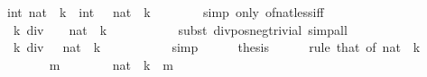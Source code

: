 \begin{isabellebody}
\ {\isacartoucheopen}int\ {\isacharparenleft}{\kern0pt}nat\ {\isacharparenleft}{\kern0pt}{\isacharminus}{\kern0pt}\ k{\isacharparenright}{\kern0pt}{\isacharparenright}{\kern0pt}\ {\isacharless}{\kern0pt}\ int\ {\isacharparenleft}{\kern0pt}{}\ {\isacharcircum}{\kern0pt}\ nat\ {\isacharparenleft}{\kern0pt}{\isacharminus}{\kern0pt}\ k{\isacharparenright}{\kern0pt}{\isacharparenright}{\kern0pt}{\isacartoucheclose}\isanewline
\ \ \ \ \ \ \isamarkupfalse%
\ {\isacharparenleft}{\kern0pt}simp\ only{\isacharcolon}{\kern0pt}\ of{\isacharunderscore}{\kern0pt}nat{\isacharunderscore}{\kern0pt}less{\isacharunderscore}{\kern0pt}iff{\isacharparenright}{\kern0pt}\isanewline
\ \ \ \ \isamarkupfalse%
\ \isamarkupfalse%
\ {\isacartoucheopen}{\isacharminus}{\kern0pt}\ k\ div\ {\isacharminus}{\kern0pt}\ {\isacharparenleft}{\kern0pt}{}\ {\isacharcircum}{\kern0pt}\ nat\ {\isacharparenleft}{\kern0pt}{\isacharminus}{\kern0pt}\ k{\isacharparenright}{\kern0pt}{\isacharparenright}{\kern0pt}\ {\isacharequal}{\kern0pt}\ {\isacharminus}{\kern0pt}\ {}{\isacartoucheclose}\isanewline
\ \ \ \ \ \ \isamarkupfalse%
\ {\isacharparenleft}{\kern0pt}subst\ div{\isacharunderscore}{\kern0pt}pos{\isacharunderscore}{\kern0pt}neg{\isacharunderscore}{\kern0pt}trivial{\isacharparenright}{\kern0pt}\ simp{\isacharunderscore}{\kern0pt}all\isanewline
\ \ \ \ \isamarkupfalse%
\ \isamarkupfalse%
\ {\isacharasterisk}{\kern0pt}{\isacharcolon}{\kern0pt}\ {\isacartoucheopen}k\ div\ {}\ {\isacharcircum}{\kern0pt}\ nat\ {\isacharparenleft}{\kern0pt}{\isacharminus}{\kern0pt}\ k{\isacharparenright}{\kern0pt}\ {\isacharequal}{\kern0pt}\ {\isacharminus}{\kern0pt}\ {}{\isacartoucheclose}\isanewline
\ \ \ \ \ \ \isamarkupfalse%
\ simp\isanewline
\ \ \ \ \isamarkupfalse%
\ thesis\isanewline
\ \ \ \ \isamarkupfalse%
\ {\isacharparenleft}{\kern0pt}rule\ that\ {\isacharbrackleft}{\kern0pt}of\ {\isacartoucheopen}nat\ {\isacharparenleft}{\kern0pt}{\isacharminus}{\kern0pt}\ k{\isacharparenright}{\kern0pt}{\isacartoucheclose}{\isacharbrackright}{\kern0pt}{\isacharparenright}{\kern0pt}\isanewline
\ \ \ \ \ \ \isamarkupfalse%
\ m\isanewline
\ \ \ \ \ \ \isamarkupfalse%
\ {\isacartoucheopen}nat\ {\isacharparenleft}{\kern0pt}{\isacharminus}{\kern0pt}\ k{\isacharparenright}{\kern0pt}\ {\isasymle}\ m{\isacartoucheclose}\isanewline
\ \ \ \ \ \ \isamarkupfalse%
\ \isamarkupfalse%

\end{isabellebody}
